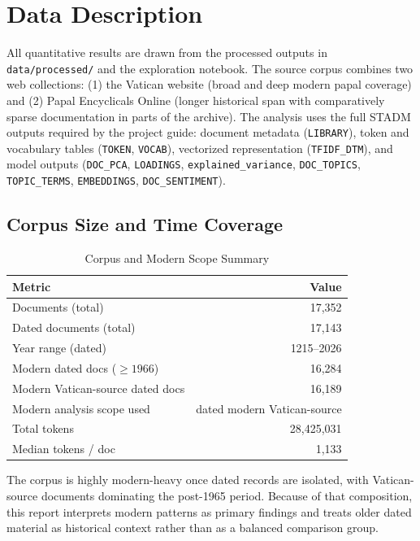 \documentclass[conference]{IEEEtran}
\begin{document}
\section{Data Description}
All quantitative results are drawn from the processed outputs in \texttt{data/processed/} and the exploration notebook. The source corpus combines two web collections: (1) the Vatican website (broad and deep modern papal coverage) and (2) Papal Encyclicals Online (longer historical span with comparatively sparse documentation in parts of the archive). The analysis uses the full STADM outputs required by the project guide: document metadata (\texttt{LIBRARY}), token and vocabulary tables (\texttt{TOKEN}, \texttt{VOCAB}), vectorized representation (\texttt{TFIDF\_DTM}), and model outputs (\texttt{DOC\_PCA}, \texttt{LOADINGS}, \texttt{explained\_variance}, \texttt{DOC\_TOPICS}, \texttt{TOPIC\_TERMS}, \texttt{EMBEDDINGS}, \texttt{DOC\_SENTIMENT}).

\subsection{Corpus Size and Time Coverage}
\begin{table}[htbp]
\caption{Corpus and Modern Scope Summary}
\label{tab:corpus_summary}
\centering
\begin{tabular}{lr}
\toprule
Metric & Value \\
\midrule
Documents (total) & 17,352 \\
Dated documents (total) & 17,143 \\
Year range (dated) & 1215--2026 \\
Modern dated docs (\(\ge 1966\)) & 16,284 \\
Modern Vatican-source dated docs & 16,189 \\
Modern analysis scope used & dated modern Vatican-source \\
Total tokens & 28,425,031 \\
Median tokens / doc & 1,133 \\
\bottomrule
\end{tabular}
\end{table}

The corpus is highly modern-heavy once dated records are isolated, with Vatican-source documents dominating the post-1965 period. Because of that composition, this report interprets modern patterns as primary findings and treats older dated material as historical context rather than as a balanced comparison group.
\end{document}
